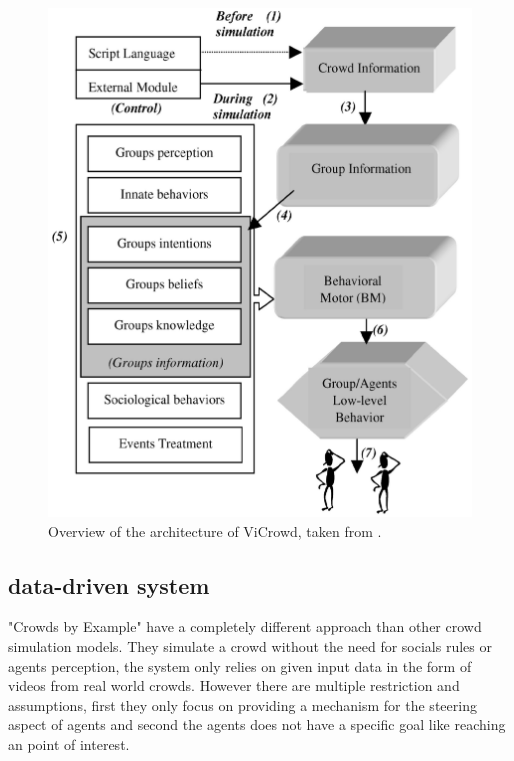 \documentclass{acmsiggraph}               %
\begin{document}
\begin{figure}[h]
  \centering
  \includegraphics[width=1\linewidth]{images/HierarchicalArchitectureOverview.png}
  \caption{Overview of the architecture of ViCrowd, taken from \protect\cite{musse_hierarchical_2001}.}
  \label{fig:hierarchicalarchitectureOverview}
\end{figure}

\subsection{data-driven system}
"Crowds by Example" \cite{lerner_crowds_2007} have a completely different approach than other crowd simulation models. They simulate a crowd without the need for socials rules or agents perception, the system only relies on given input data in the form of videos from real world crowds.
However there are multiple restriction and assumptions, first they only focus on providing a mechanism for the steering aspect of agents and second the agents does not have a specific goal like reaching an point of interest.
\end{document}
